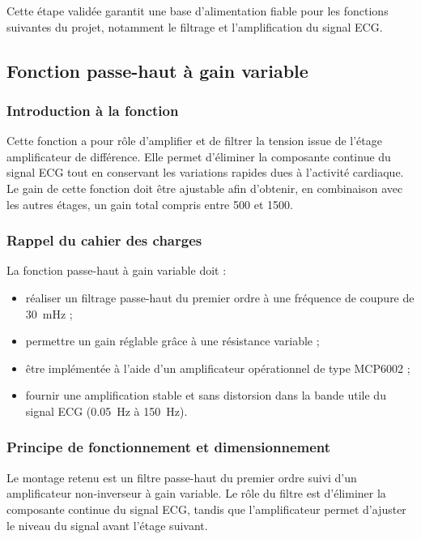 \documentclass{article}
\begin{document}
Cette étape validée garantit une base d’alimentation fiable pour les fonctions suivantes du projet, notamment le filtrage et l’amplification du signal ECG.

\newpage

\subsection{Fonction passe-haut à gain variable}

\subsubsection{Introduction à la fonction}

Cette fonction a pour rôle d’amplifier et de filtrer la tension issue de l’étage amplificateur de différence.  
Elle permet d’éliminer la composante continue du signal ECG tout en conservant les variations rapides dues à l’activité cardiaque.  
Le gain de cette fonction doit être ajustable afin d’obtenir, en combinaison avec les autres étages, un gain total compris entre 500 et 1500.

\subsubsection{Rappel du cahier des charges}

La fonction passe-haut à gain variable doit :
\begin{itemize}
    \item réaliser un filtrage passe-haut du premier ordre à une fréquence de coupure de 30~mHz ;
    \item permettre un gain réglable grâce à une résistance variable ;
    \item être implémentée à l’aide d’un amplificateur opérationnel de type MCP6002 ;
    \item fournir une amplification stable et sans distorsion dans la bande utile du signal ECG (0.05~Hz à 150~Hz).
\end{itemize}

\subsubsection{Principe de fonctionnement et dimensionnement}

Le montage retenu est un filtre passe-haut du premier ordre suivi d’un amplificateur non-inverseur à gain variable.  
Le rôle du filtre est d’éliminer la composante continue du signal ECG, tandis que l’amplificateur permet d’ajuster le niveau du signal avant l’étage suivant.
\end{document}

